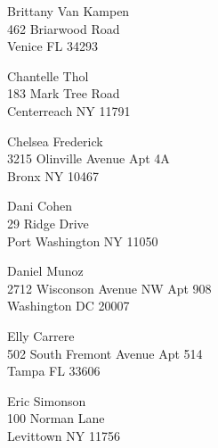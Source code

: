 \documentclass{article}
\begin{document}
\begin{center}
\begin{Huge}
\clearpage

\vspace*{\fill}
Brittany Van Kampen\\
462 Briarwood Road\\
Venice FL 34293\\
\vspace{\fill}

\clearpage

\vspace*{\fill}
Chantelle Thol\\
183 Mark Tree Road\\
Centerreach NY 11791\\
\vspace{\fill}

\clearpage

\vspace*{\fill}
Chelsea Frederick\\
3215 Olinville Avenue Apt 4A\\
Bronx NY 10467\\
\vspace{\fill}

\clearpage

\vspace*{\fill}
Dani Cohen\\
29 Ridge Drive\\
Port Washington NY 11050\\
\vspace{\fill}

\clearpage

\vspace*{\fill}
Daniel Munoz\\
2712 Wisconson Avenue NW Apt 908\\
Washington DC 20007\\
\vspace{\fill}

\clearpage

\vspace*{\fill}
Elly Carrere\\
502 South Fremont Avenue Apt 514\\
Tampa FL 33606\\
\vspace{\fill}

\clearpage

\vspace*{\fill}
Eric Simonson\\
100 Norman Lane\\
Levittown NY 11756\\
\vspace{\fill}


\end{Huge}
\end{center}
\end{document}
